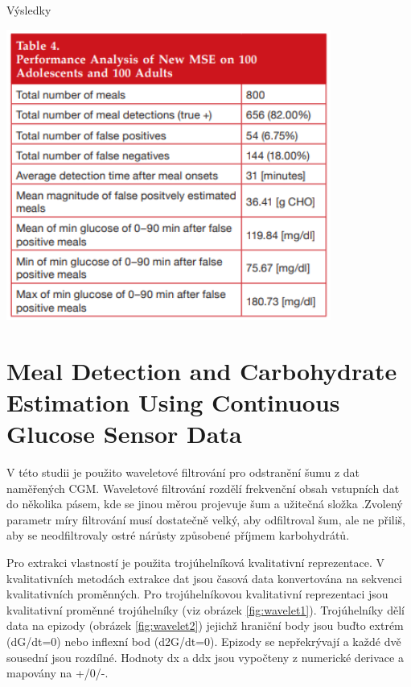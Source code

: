 \begin{table}[H]
\caption{Výsledky}
\label{tab:threshold3}
\centering
\includegraphics[width=0.8\textwidth]{img/analyza/threshold3.png}
\end{table}


\section{Meal Detection and Carbohydrate Estimation Using Continuous Glucose Sensor Data \citep{Analyza.WaveletEst}}
\label{ch:wavelet}

V této studii je použito waveletové filtrování pro odstranění šumu z dat naměřených CGM. Waveletové filtrování rozdělí frekvenční obsah vstupních dat do několika pásem, kde se jinou měrou projevuje šum a užitečná složka \citep{Analyza.Wavelet}.Zvolený parametr míry filtrování musí dostatečně velký, aby odfiltroval šum, ale ne přiliš, aby se neodfiltrovaly ostré nárůsty způsobené příjmem karbohydrátů.

Pro extrakci vlastností je použita trojúhelníková kvalitativní reprezentace. V kvalitativních metodách extrakce dat jsou časová data konvertována na sekvenci kvalitativních proměnných. Pro trojúhelníkovou kvalitativní reprezentaci jsou kvalitativní proměnné trojúhelníky (viz obrázek \ref{fig:wavelet1}). Trojúhelníky dělí data na epizody (obrázek \ref{fig:wavelet2}) jejichž hraniční body jsou buďto extrém (dG/dt=0) nebo inflexní bod (d2G/dt=0). Epizody se nepřekrývají a každé dvě sousední jsou rozdílné. Hodnoty dx a ddx jsou vypočteny z numerické derivace a mapovány na +/0/-.

